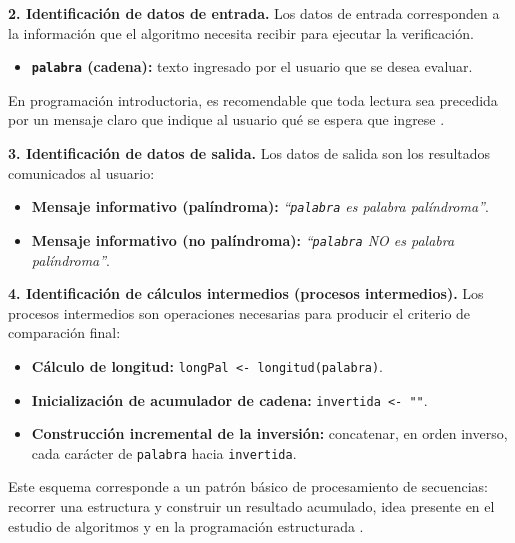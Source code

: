 \documentclass[12pt,twoside]{book}
\begin{document}
						\noindent
						\textbf{2. Identificación de datos de entrada.}
						Los datos de entrada corresponden a la información que el algoritmo necesita recibir para ejecutar la verificación.
						
						\begin{itemize}
							\item \textbf{\texttt{palabra} (cadena):} texto ingresado por el usuario que se desea evaluar.
						\end{itemize}
						
						\noindent
						En programación introductoria, es recomendable que toda lectura sea precedida por un mensaje claro que indique al usuario qué se espera que ingrese \cite{Farrell2018Programming,Gaddis2022Starting}.
						
						\noindent
						\textbf{3. Identificación de datos de salida.}
						Los datos de salida son los resultados comunicados al usuario:
						
						\begin{itemize}
							\item \textbf{Mensaje informativo (palíndroma):} \textit{``\texttt{palabra} es palabra palíndroma''}.
							\item \textbf{Mensaje informativo (no palíndroma):} \textit{``\texttt{palabra} NO es palabra palíndroma''}.
						\end{itemize}
						
						\noindent
						\textbf{4. Identificación de cálculos intermedios (procesos intermedios).}
						Los procesos intermedios son operaciones necesarias para producir el criterio de comparación final:
						
						\begin{itemize}
							\item \textbf{Cálculo de longitud:} \texttt{longPal <- longitud(palabra)}.
							\item \textbf{Inicialización de acumulador de cadena:} \texttt{invertida <- ""}.
							\item \textbf{Construcción incremental de la inversión:} concatenar, en orden inverso, cada carácter de \texttt{palabra} hacia \texttt{invertida}.
						\end{itemize}
						
						\noindent
						Este esquema corresponde a un patrón básico de procesamiento de secuencias: recorrer una estructura y construir un resultado acumulado, idea presente en el estudio de algoritmos y en la programación estructurada \cite{Cormen2022Introduction,Joyanes2007Fundamentos}.
						
\end{document}
